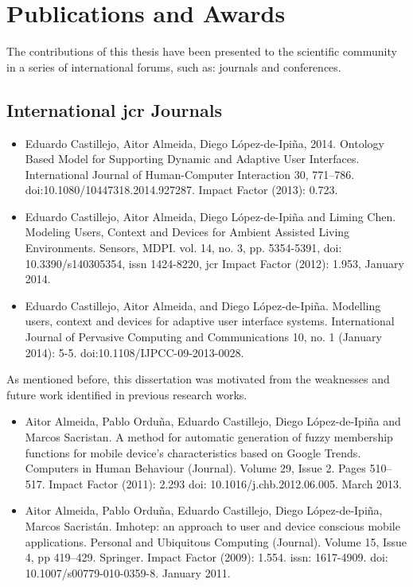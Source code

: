 \section{Publications and Awards}
\label{sec:publications}

The contributions of this thesis have been presented to the scientific community 
in a series of international forums, such as: journals and conferences.

\subsection{International \acs{jcr} Journals}


\begin{itemize}
  \item Eduardo Castillejo, Aitor Almeida, Diego {López-de-Ipiña}, 2014. 
  Ontology Based Model for Supporting Dynamic and Adaptive User Interfaces. 
  International Journal of Human-Computer Interaction 30, 771–786. 
  \acs{doi}:10.1080/10447318.2014.927287. Impact Factor (2013): 0.723.

  \item Eduardo Castillejo, Aitor Almeida, Diego {López-de-Ipiña} and Liming Chen. 
  Modeling Users, Context and Devices for Ambient Assisted Living 
  Environments. Sensors, MDPI. vol. 14, no. 3, pp. 5354-5391, \acs{doi}: 
  10.3390/s140305354, \acs{issn} 1424-8220, \acs{jcr} Impact Factor (2012): 1.953, 
  January 2014.
  
  \item Eduardo Castillejo, Aitor Almeida, and Diego {López-de-Ipiña}. Modelling 
  users, context and devices for adaptive user interface systems. International 
  Journal of Pervasive Computing and Communications 10, no. 1 (January 2014): 
  5-5. \acs{doi}:10.1108/IJPCC-09-2013-0028.
\end{itemize}
  
As mentioned before, this dissertation was motivated from the weaknesses and 
future work identified in previous research works. 

\begin{itemize}
  \item Aitor Almeida, Pablo Orduña, Eduardo Castillejo, Diego {López-de-Ipiña} 
  and Marcos Sacristan. A method for automatic generation of fuzzy membership 
  functions for mobile device’s characteristics based on Google Trends. 
  Computers in Human Behaviour (Journal). Volume 29, Issue 2. Pages 510–517. 
  Impact Factor (2011): 2.293 \acs{doi}: 10.1016/j.chb.2012.06.005. March 2013.
  
  \item Aitor Almeida, Pablo Orduña, Eduardo Castillejo, Diego {López-de-Ipiña}, 
  Marcos Sacristán. Imhotep: an approach to user and device conscious mobile 
  applications. Personal and Ubiquitous Computing (Journal). Volume 15, Issue 
  4, pp 419–429. Springer. Impact Factor (2009): 1.554. \acs{issn}: 1617-4909. 
  \acs{doi}: 10.1007/s00779-010-0359-8. January 2011.
\end{itemize}


